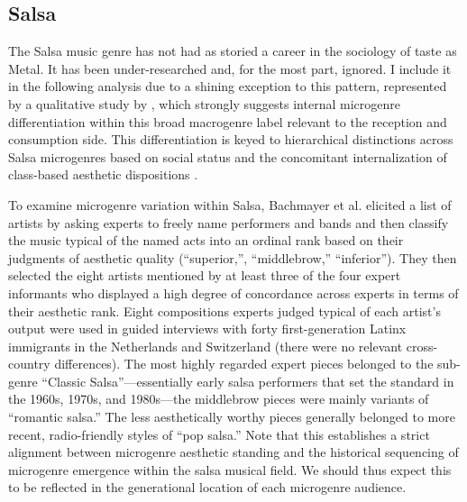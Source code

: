 \documentclass[a4paper,12pt]{article}
\begin{document}
\subsection{Salsa}
The Salsa music genre has not had as storied a career in the sociology of taste as Metal. It has been under-researched and, for the most part, ignored. I include it in the following analysis due to a shining exception to this pattern, represented by a qualitative study by \citet{Bachmayer2014-pk}, which strongly suggests internal microgenre differentiation within this broad macrogenre label relevant to the reception and consumption side. This differentiation is keyed to hierarchical distinctions across Salsa microgenres based on social status and the concomitant internalization of class-based aesthetic dispositions \citep{lizardo2012reconceptualizing}. 

To examine microgenre variation within Salsa, Bachmayer et al. elicited a list of artists by asking experts to freely name performers and bands and then classify the music typical of the named acts into an ordinal rank based on their judgments of aesthetic quality (``superior,'', ``middlebrow,'' ``inferior''). They then selected the eight artists mentioned by at least three of the four expert informants who displayed a high degree of concordance across experts in terms of their aesthetic rank. Eight compositions experts judged typical of each artist's output were used in guided interviews with forty first-generation Latinx immigrants in the Netherlands and Switzerland (there were no relevant cross-country differences). The most highly regarded expert pieces belonged to the sub-genre ``Classic Salsa''---essentially early salsa performers that set the standard in the 1960s, 1970s, and 1980s---the middlebrow pieces were mainly variants of ``romantic salsa.'' The less aesthetically worthy pieces generally belonged to more recent, radio-friendly styles of ``pop salsa.'' Note that this establishes a strict alignment between microgenre aesthetic standing and the historical sequencing of microgenre emergence within the salsa musical field. We should thus expect this to be reflected in the generational location of each microgenre audience.
\end{document}

